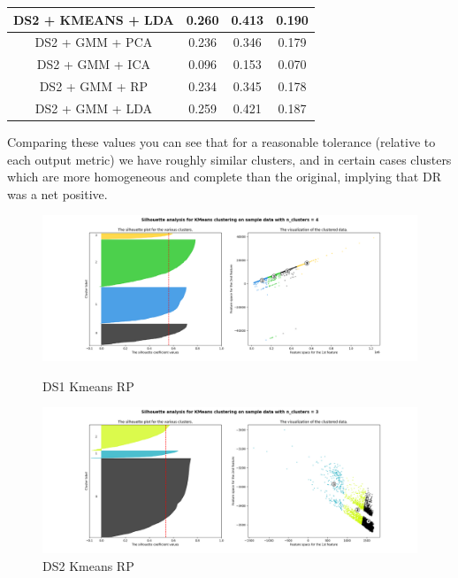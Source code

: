 \documentclass[11pt]{article}
\begin{document}
\begin{center}
\begin{tabular}{|c| c | c | c |}
            \hline
            DS2 + KMEANS + LDA & 0.260                         & 0.413             & 0.190              \\
            \hline
            DS2 + GMM + PCA    & 0.236                         & 0.346             & 0.179              \\
            \hline
            DS2 + GMM + ICA    & 0.096                         & 0.153             & 0.070              \\
            \hline
            DS2 + GMM + RP     & 0.234                         & 0.345             & 0.178              \\
            \hline
            DS2 + GMM + LDA    & 0.259                         & 0.421             & 0.187              \\
            \hline
        \end{tabular}
    \end{center}
    Comparing these values you can see that for a reasonable tolerance (relative to each output metric) we have roughly
    similar clusters, and in certain cases clusters which are more homogeneous and complete than the original, implying
    that DR was a net positive.
    \begin{figure}
        \begin{minipage}{0.5\textwidth}
            \centering
            \includegraphics[width=1\linewidth]{ds1_kmeans_rp.png}
            \caption{DS1 Kmeans RP}\label{Fig:DS1 Kmeans RP}
        \end{minipage}
        \begin{minipage}{0.5\textwidth}
            \centering
            \includegraphics[width=1\linewidth]{ds2_kmeans_rp.png}
            \caption{DS2 Kmeans RP}\label{Fig:DS2 Kmeans RP}
        \end{minipage}

    \end{figure}
\end{document}
